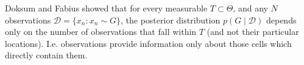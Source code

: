 Doksum and Fabius showed that for every measurable $T \subset \Theta$, and any $N$ observations $\mathcal D = \{x_n: x_n \sim G\}$, the posterior distribution $p(G \mid \mathcal D)$ depends only on the number of observations that fall within $T$ (and not their particular locations). I.e. observations provide information only about those cells which directly contain them.